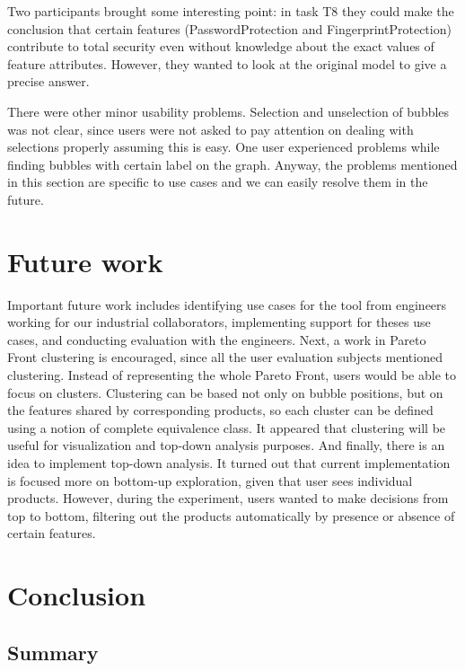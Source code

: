 \documentclass{acm_proc_article-sp}
\begin{document}
Two participants brought some interesting point: in task T8 they could make the conclusion that certain features (PasswordProtection and FingerprintProtection) contribute to total security even without knowledge about the exact values of feature attributes. However, they wanted to look at the original model to give a precise answer. 

There were other minor usability problems. Selection and unselection of bubbles was not clear, since users were not asked to pay attention on dealing with selections properly assuming this is easy. One user experienced problems while finding bubbles with certain label on the graph. Anyway, the problems mentioned in this section are specific to use cases and we can easily resolve them in the future.



\section{Future work}

Important future work includes identifying use cases for the tool from engineers working for our industrial collaborators, implementing support for theses use cases, and conducting evaluation with the engineers. Next, a work in Pareto Front clustering is encouraged, since all the user evaluation subjects mentioned clustering. Instead of representing the whole Pareto Front, users would be able to focus on clusters. Clustering can be based not only on bubble positions, but on the features shared by corresponding products, so each cluster can be defined using a notion of complete equivalence class. It appeared that clustering will be useful for visualization and top-down analysis purposes. And finally, there is an idea to implement top-down analysis. It turned out that current implementation is focused more on bottom-up exploration, given that user sees individual products. However, during the experiment, users wanted to make decisions from top to bottom, filtering out the products automatically by presence or absence of certain features.

\section{Conclusion}

\subsection{Summary}
\end{document}

